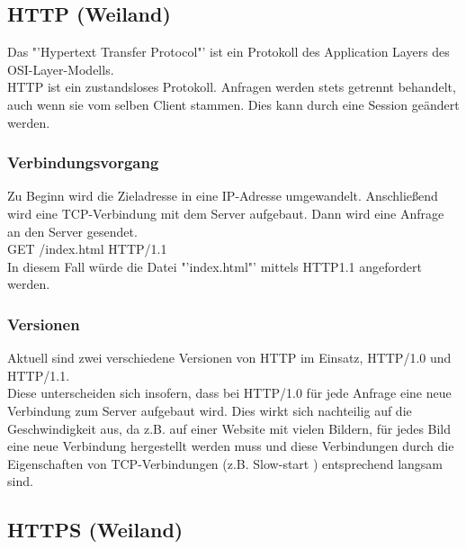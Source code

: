 \subsection{HTTP (Weiland)}

Das "'Hypertext Transfer Protocol"' ist ein Protokoll des Application Layers des OSI-Layer-Modells.
\\
HTTP ist ein zustandsloses Protokoll. Anfragen werden stets getrennt behandelt, auch wenn sie vom selben Client stammen. Dies kann durch eine Session geändert werden.
\subsubsection{Verbindungsvorgang}

Zu Beginn wird die Zieladresse in eine IP-Adresse umgewandelt. Anschließend wird eine TCP-Verbindung  mit dem Server aufgebaut. 
Dann wird eine Anfrage an den Server gesendet.
\\
GET /index.html HTTP/1.1
\\
In diesem Fall würde die Datei "'index.html"' mittels HTTP1.1 angefordert werden.

\subsubsection{Versionen}
Aktuell sind zwei verschiedene Versionen von HTTP im Einsatz, HTTP/1.0 und HTTP/1.1.
\\
Diese unterscheiden sich insofern, dass bei HTTP/1.0 für jede Anfrage eine neue Verbindung zum Server aufgebaut wird. Dies wirkt sich nachteilig auf die Geschwindigkeit aus, da z.B. auf einer Website mit vielen Bildern, für jedes Bild eine neue Verbindung hergestellt werden muss und diese Verbindungen durch die Eigenschaften von TCP-Verbindungen (z.B. Slow-start ) entsprechend langsam sind.

\subsection{HTTPS (Weiland)}
